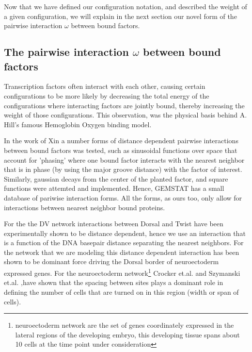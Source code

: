 Now that we have defined our configuration notation, and described the weight of a given configuration, we will explain in the next section our novel form of the pairwise interaction $\omega$ between bound factors.
%
%


\subsection{The pairwise interaction $\omega$ between bound factors}
%
Transcription factors often interact with each other, causing certain configurations to be more likely by decreasing the total energy of the configurations where interacting factors are jointly bound, thereby increasing the weight of those configurations.  This observation, was the physical basis behind A. Hill's famous Hemoglobin Oxygen binding model.  

In the work of Xin a number forms of distance dependent pairwise interactions between bound factors was tested, such as sinusoidal functions over space that account for 'phasing' where one bound factor interacts with the nearest neighbor that is in phase (by using the major groove distance) with the factor of interest.  Similarly, gaussian decays from the center of the planted factor, and square functions were attemted and implemented.  Hence, GEMSTAT has a small database of pariwise interaction forms.  All the forms, as ours too, only allow for interactions between nearest neighbor bound proteins. 

For the the DV network interactions between Dorsal and Twist have been experimentally shown to be distance dependent, hence we use an interaction that is a function of the DNA basepair distance separating the nearest neighbors.  For the network that we are modeling this distance dependent interaction has been shown to be dominant force driving the Dorsal border of neuroectoderm expressed genes.  For the neuroectoderm network\footnote[2]{neuroectoderm network are the set of genes coordinately expressed in the lateral regions of the developing embryo, this developing tissue spans about 10 cells at the time point under consideration}  Crocker et.al. and Szymanski et.al. \cite{pmid7774581},\cite{pmid18986212}have shown that the spacing between sites plays a dominant role in defining the number of cells that are turned on in this region (width or span of cells).

